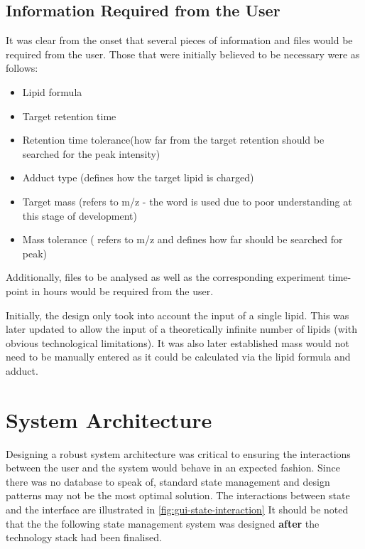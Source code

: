 \documentclass{l4proj}
\begin{document}
\subsection{Information Required from the User}
It was clear from the onset that several pieces of information and files would be required from the user. Those that were initially believed to be necessary were as follows:
\begin{itemize}
    \item Lipid formula
    \item Target retention time
    \item Retention time tolerance(how far from the target retention should be searched for the peak intensity)
    \item Adduct type (defines how the target lipid is charged)
    \item Target mass (refers to m/z - the word  is used due to poor understanding at this stage of development)
    \item Mass tolerance ( refers to m/z and defines how far should be searched for peak)
\end{itemize}

Additionally, files to be analysed as well as the corresponding experiment time-point in hours would be required from the user.

Initially, the design only took into account the input of a single lipid. This was later updated to allow the input of a theoretically infinite number of lipids (with obvious technological limitations). It was also later established mass would not need to be manually entered as it could be calculated via the lipid formula and adduct.

\section{System Architecture} \label{system-architecture-design}
Designing a robust system architecture was critical to ensuring the interactions between the user and the system would behave in an expected fashion. Since there was no database to speak of, standard state management and design patterns may not be the most optimal solution. The interactions between state and the interface are illustrated in \ref{fig:gui-state-interaction} It should be noted that the the following state management system was designed \textbf{after} the technology stack had been finalised.
\end{document}
